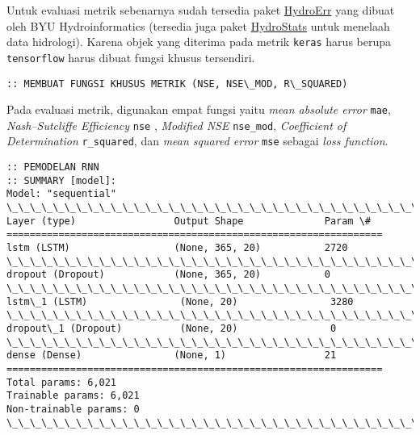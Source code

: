 \documentclass[11pt]{article}
\begin{document}
Untuk evaluasi metrik sebenarnya sudah tersedia paket
\href{https://github.com/BYU-Hydroinformatics/HydroErr}{HydroErr} yang
dibuat oleh BYU Hydroinformatics (tersedia juga paket
\href{https://github.com/BYU-Hydroinformatics/Hydrostats}{HydroStats}
untuk menelaah data hidrologi). Karena objek yang diterima pada metrik
\texttt{keras} harus berupa \texttt{tensorflow} harus dibuat fungsi
khusus tersendiri.

    \begin{Verbatim}[commandchars=\\\{\}]
:: MEMBUAT FUNGSI KHUSUS METRIK (NSE, NSE\_MOD, R\_SQUARED)
    \end{Verbatim}

    Pada evaluasi metrik, digunakan empat fungsi yaitu \emph{mean absolute
error} \texttt{mae}, \emph{Nash--Sutcliffe Efficiency} \texttt{nse} ,
\emph{Modified NSE} \texttt{nse\_mod}, \emph{Coefficient of
Determination} \texttt{r\_squared}, dan \emph{mean squared error}
\texttt{mse} sebagai \emph{loss function}.

    \begin{Verbatim}[commandchars=\\\{\}]
:: PEMODELAN RNN
:: SUMMARY [model]:
Model: "sequential"
\_\_\_\_\_\_\_\_\_\_\_\_\_\_\_\_\_\_\_\_\_\_\_\_\_\_\_\_\_\_\_\_\_\_\_\_\_\_\_\_\_\_\_\_\_\_\_\_\_\_\_\_\_\_\_\_\_\_\_\_\_\_\_\_\_
Layer (type)                 Output Shape              Param \#
=================================================================
lstm (LSTM)                  (None, 365, 20)           2720
\_\_\_\_\_\_\_\_\_\_\_\_\_\_\_\_\_\_\_\_\_\_\_\_\_\_\_\_\_\_\_\_\_\_\_\_\_\_\_\_\_\_\_\_\_\_\_\_\_\_\_\_\_\_\_\_\_\_\_\_\_\_\_\_\_
dropout (Dropout)            (None, 365, 20)           0
\_\_\_\_\_\_\_\_\_\_\_\_\_\_\_\_\_\_\_\_\_\_\_\_\_\_\_\_\_\_\_\_\_\_\_\_\_\_\_\_\_\_\_\_\_\_\_\_\_\_\_\_\_\_\_\_\_\_\_\_\_\_\_\_\_
lstm\_1 (LSTM)                (None, 20)                3280
\_\_\_\_\_\_\_\_\_\_\_\_\_\_\_\_\_\_\_\_\_\_\_\_\_\_\_\_\_\_\_\_\_\_\_\_\_\_\_\_\_\_\_\_\_\_\_\_\_\_\_\_\_\_\_\_\_\_\_\_\_\_\_\_\_
dropout\_1 (Dropout)          (None, 20)                0
\_\_\_\_\_\_\_\_\_\_\_\_\_\_\_\_\_\_\_\_\_\_\_\_\_\_\_\_\_\_\_\_\_\_\_\_\_\_\_\_\_\_\_\_\_\_\_\_\_\_\_\_\_\_\_\_\_\_\_\_\_\_\_\_\_
dense (Dense)                (None, 1)                 21
=================================================================
Total params: 6,021
Trainable params: 6,021
Non-trainable params: 0
\_\_\_\_\_\_\_\_\_\_\_\_\_\_\_\_\_\_\_\_\_\_\_\_\_\_\_\_\_\_\_\_\_\_\_\_\_\_\_\_\_\_\_\_\_\_\_\_\_\_\_\_\_\_\_\_\_\_\_\_\_\_\_\_\_
    \end{Verbatim}
\end{document}
